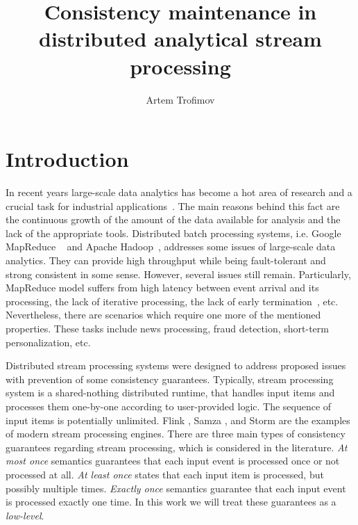 \documentclass{llncs}
\begin{document}
\title {Consistency maintenance in distributed analytical stream processing}
\author{Artem Trofimov}

\maketitle

\begin{abstract}

\end {abstract}

\section {Introduction}
In recent years large-scale data analytics has become a hot area of research and a crucial task for industrial applications~\cite{Zou:2010:SRQ:1920841.1921012}. The main reasons behind this fact are the continuous growth of the amount of the data available for analysis and the lack of the appropriate tools. Distributed batch processing systems, i.e. Google MapReduce ~\cite{Dean:2008:MSD:1327452.1327492} and Apache Hadoop~\cite{hadoop2009hadoop}, addresses some issues of large-scale data analytics. They can provide high throughput while being fault-tolerant and strong consistent in some sense. However, several issues still remain. Particularly, MapReduce model suffers from high latency between event arrival and its processing, the lack of iterative processing, the lack of early termination~\cite{Doulkeridis:2014:SLA:2628707.2628782}, etc. Nevertheless, there are scenarios which require one more of the mentioned properties. These tasks include news processing, fraud detection, short-term personalization, etc.

Distributed stream processing systems were designed to address proposed issues with prevention of some consistency guarantees. Typically, stream processing system is a shared-nothing distributed runtime, that handles input items and processes them one-by-one according to user-provided logic. The sequence of input items is potentially unlimited. Flink \cite{carbone2015apache}, Samza \cite{Noghabi:2017:SSS:3137765.3137770}, and Storm \cite{apache:storm} are the examples of modern stream processing engines. There are three main types of consistency guarantees regarding stream processing, which is considered in the literature. {\em At most once} semantics guarantees that each input event is processed once or not processed at all. {\em At least once} states that each input item is processed, but possibly multiple times. {\em Exactly once} semantics guarantee that each input event is processed exactly one time. In this work we will treat these guarantees as a {\em low-level}. 
\end{document}

